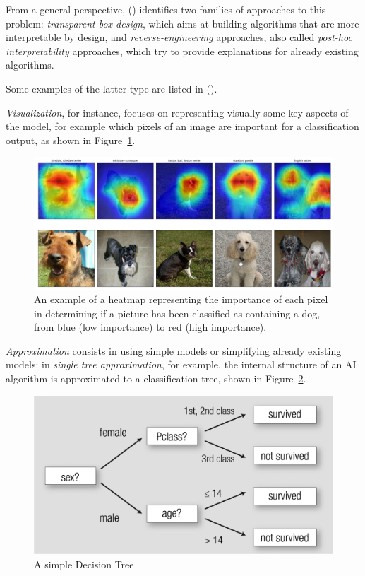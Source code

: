 \documentclass[conference]{IEEEtran}
\begin{document}
From a general perspective, (\cite{Giannotti}) identifies two families of
approaches to this problem: \textit{transparent box design}, which aims at
building algorithms that are more interpretable by design, and
\textit{reverse-engineering} approaches, also called \textit{post-hoc
    interpretability} approaches, which try to provide explanations for already
existing algorithms.

Some examples of the latter type are listed in (\cite{nasaxai}).

\textit{Visualization}, for instance, focuses on representing visually
some key aspects of the model, for example which pixels of an image are important for a classification output, as shown in Figure~\ref{fig:heatmap}.

\begin{figure}[h!] \centering
    \includegraphics[width=0.9\linewidth]{images/dog_localization.png}
    \caption{An example of a heatmap representing the importance of each pixel
        in determining if a picture has been classified as containing a dog, from
        blue (low importance) to red (high importance). } \label{fig:heatmap}
\end{figure}

\textit{Approximation} consists in using simple models or simplifying already
existing models: in \textit{single tree approximation}, for example, the
internal structure of an AI algorithm is approximated to a classification tree,
shown in Figure~\ref{fig:dectree}.

\begin{figure}[ht!] \centering
    \includegraphics[width=0.9\linewidth]{images/dectree} \caption{A simple
        Decision Tree} \label{fig:dectree} \end{figure}
\end{document}
